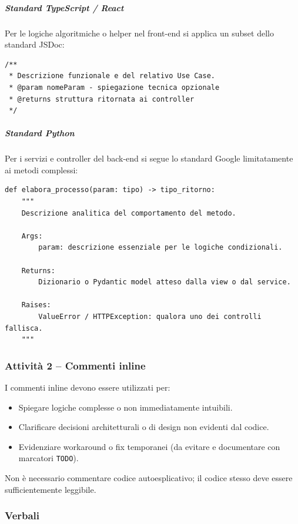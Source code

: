 \documentclass[a4paper, 11pt, oneside]{scrartcl}
\begin{document}
\subparagraph{Standard TypeScript / React}
Per le logiche algoritmiche o helper nel front-end si applica un subset dello standard JSDoc:
\begin{verbatim}
/**
 * Descrizione funzionale e del relativo Use Case.
 * @param nomeParam - spiegazione tecnica opzionale
 * @returns struttura ritornata ai controller
 */
\end{verbatim}

\subparagraph{Standard Python}
Per i servizi e controller del back-end si segue lo standard Google limitatamente ai metodi complessi:
\begin{verbatim}
def elabora_processo(param: tipo) -> tipo_ritorno:
    """
    Descrizione analitica del comportamento del metodo.

    Args:
        param: descrizione essenziale per le logiche condizionali.

    Returns:
        Dizionario o Pydantic model atteso dalla view o dal service.

    Raises:
        ValueError / HTTPException: qualora uno dei controlli fallisca.
    """
\end{verbatim}

\subsubsection{Attività 2 -- Commenti inline}

I commenti inline devono essere utilizzati per:
\begin{itemize}
    \item Spiegare logiche complesse o non immediatamente intuibili.
    \item Clarificare decisioni architetturali o di design non evidenti dal codice.
    \item Evidenziare workaround o fix temporanei (da evitare e documentare con marcatori \texttt{TODO}).
\end{itemize}
Non è necessario commentare codice autoesplicativo; il codice stesso deve essere sufficientemente leggibile.

\subsubsection{Verbali}
\label{sec:verbali}
\end{document}
